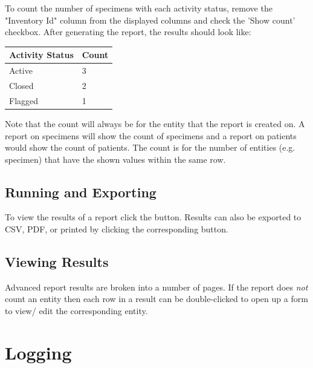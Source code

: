 To count the number of specimens with each activity status, remove the "Inventory Id" column from the displayed columns and check the 'Show count' checkbox. After generating the report, the results should look like:

\begin{tabular}{| l | l |}
  \hline
  Activity Status & Count \\ \hline
  Active & 3 \\ \hline
  Closed & 2 \\ \hline
  Flagged & 1 \\ \hline
\end{tabular}

Note that the count will always be for the entity that the report is created on. A report on specimens will show the count of specimens and a report on patients would show the count of patients. The count is for the number of entities (e.g. specimen) that have the shown values within the same row.

\subsection{Running and Exporting}

To view the results of a report click the  button. Results can also be exported to CSV, PDF, or printed by clicking the corresponding button.

\subsection{Viewing Results}

Advanced report results are broken into a number of pages. If the report does \emph{not} count an entity then each row in a result can be double-clicked to open up a form to view/ edit the corresponding entity.

\newpage
\section{Logging}
